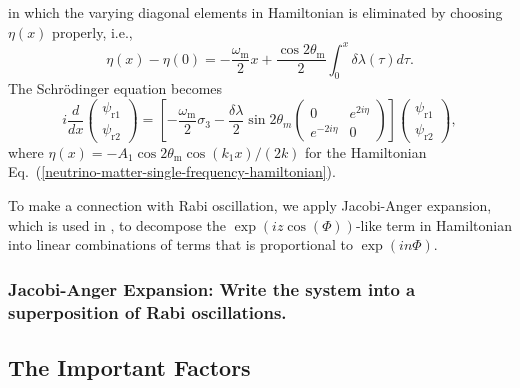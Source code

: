 \documentclass[%
preprint,
 amsmath,amssymb,
 aps,
]{revtex4-1}
\begin{document}
in which the varying diagonal elements in Hamiltonian is eliminated by choosing $\eta(x)$ properly, i.e.,
\begin{equation}
    \eta(x) - \eta(0) = - \frac{\omega_{\mathrm{m}}}{2} x + \frac{\cos 2\theta_{\mathrm{m}}}{2} \int_0^x \delta\lambda (\tau) d\tau.
\end{equation}
The Schr\"{o}dinger equation becomes
\begin{equation}
    i \frac{d}{dx} \begin{pmatrix} \psi_{\mathrm r1} \\ \psi_{\mathrm r2} \end{pmatrix} = \left[ - \frac{\omega_{\mathrm m}}{2} \sigma_3 - \frac{\delta \lambda}{2} \sin 2\theta_m \begin{pmatrix} 0 & e^{2i\eta} \\ e^{-2 i\eta } & 0 \end{pmatrix}\right] \begin{pmatrix} \psi_{\mathrm r1} \\ \psi_{\mathrm r2} \end{pmatrix},
\end{equation}
where $\eta(x) = - A_1 \cos 2\theta_{\mathrm m} \cos (k_1 x)/(2 k) $ for the Hamiltonian Eq.~(\ref{neutrino-matter-single-frequency-hamiltonian}).

To make a connection with Rabi oscillation, we apply Jacobi-Anger expansion, which is used in \cite{Kneller2013}, to decompose the $\exp\left( i z \cos\left(\Phi \right) \right)$-like term in Hamiltonian into linear combinations of terms that is proportional to $\exp\left(i n \Phi \right)$.




\subsubsection{Jacobi-Anger Expansion: Write the system into a superposition of Rabi oscillations.}
    
    





    

\subsection{The Important Factors}



\end{document}
